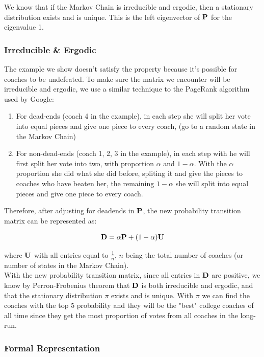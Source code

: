 \documentclass[titlepage,12pt]{article}
\begin{document}
\noindent We know that if the Markov Chain is irreducible and ergodic, then a stationary distribution exists and is unique. This is the left eigenvector of $\bf{P}$ for the eigenvalue 1.


\subsubsection*{Irreducible \& Ergodic}

\noindent The example we show doesn't satisfy the property because it's possible for coaches to be undefeated. To make sure the matrix we encounter will be irreducible and ergodic, we use a similar technique to the PageRank algorithm used by Google:

\begin{enumerate}
\item For dead-ends (coach 4 in the example), in each step she will split her vote into equal pieces and give one piece to every coach, (go to a random state in the Markov Chain)
\item For non-dead-ends (coach 1, 2, 3 in the example), in each step with he will first split her vote into two, with proportion $\alpha$ and $1 - \alpha$. With the $\alpha$ proportion she did what she did before, spliting it and give the pieces to coaches who have beaten her, the remaining $1 - \alpha$ she will split into equal pieces and give one piece to every coach.
\end{enumerate}

\noindent Therefore, after adjusting for deadends in ${\bf P}$, the new probability transition matrix can be represented as:

$${\bf D} = \alpha {\bf P} + (1 - \alpha) {\bf U}$$

\noindent where $\bf{U}$ with all entries equal to $\frac{1}{n}$, $n$ being the total number of coaches (or number of states in the Markov Chain).
\\

\noindent With the new probability transition matrix, since all entries in $\bf{D}$ are positive, we know by Perron-Frobenius theorem that $\bf{D}$ is both irreducible and ergodic, and that the stationary distribution $\pi$ exists and is unique. With $\pi$ we can find the coaches with the top $5$ probability and they will be the "best" college coaches of all time since they get the most proportion of votes from all coaches in the long-run.

\subsubsection*{Formal Representation}
\end{document}
